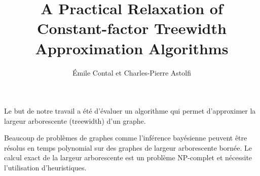\documentclass[final]{beamer} %
\title{\VeryHuge A Practical Relaxation of Constant-factor Treewidth
        Approximation Algorithms}
\author{\huge Émile Contal et Charles-Pierre Astolfi}
\date{}
\begin{document}
  \begin{frame}{} 
\maketitle
\begin{block}
\centering
\huge Le but de notre travail a été d'évaluer un algorithme qui permet
d'approximer la largeur arborescente (treewidth) d'un graphe.

Beaucoup de problèmes de graphes comme l'inférence bayésienne peuvent
être résolus en temps polynomial sur des graphes de largeur
arborescente bornée. Le calcul exact de la largeur arborescente est un
problème NP-complet et nécessite l'utilisation d'heuristiques.
\end{block}
  \end{frame}
  
\end{document}
